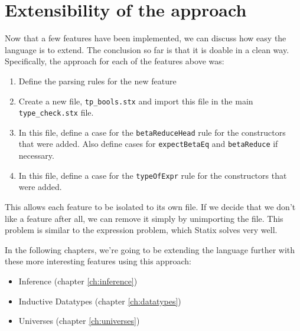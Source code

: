 \section{Extensibility of the approach}

Now that a few features have been implemented, we can discuss how easy the language is to extend. The conclusion so far is that it is doable in a clean way. Specifically, the approach for each of the features above was:

\begin{enumerate}
	\item Define the parsing rules for the new feature
	\item Create a new file, \verb|tp_bools.stx| and import this file in the main \verb|type_check.stx| file.
	\item In this file, define a case for the \verb|betaReduceHead| rule for the constructors that were added. Also define cases for \verb|expectBetaEq| and \verb|betaReduce| if necessary.
	\item In this file, define a case for the \verb|typeOfExpr| rule for the constructors that were added.
\end{enumerate}

This allows each feature to be isolated to its own file. If we decide that we don't like a feature after all, we can remove it simply by unimporting the file. This problem is similar to the expression problem\cite{expression_problem}, which Statix solves very well.

In the following chapters, we're going to be extending the language further with these more interesting features using this approach:
\begin{itemize}
	\item Inference (chapter \ref{ch:inference})
	\item Inductive Datatypes (chapter \ref{ch:datatypes})
	\item Universes (chapter \ref{ch:universes})
\end{itemize}



